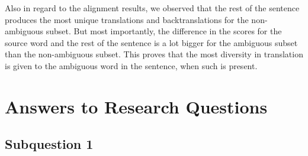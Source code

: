 Also in regard to the alignment results, we observed that the rest of the sentence produces the most unique translations and backtranslations for the non-ambiguous subset. But most importantly, the difference in the scores for the source word and the rest of the sentence is a lot bigger for the ambiguous subset than the non-ambiguous subset. This proves that the most diversity in translation is given to the ambiguous word in the sentence, when such is present.












\section{Answers to Research Questions}
\label{sec:Discussion:Answers}

\subsection{Subquestion 1} %
\label{sec:Discussion:Answers:1}

